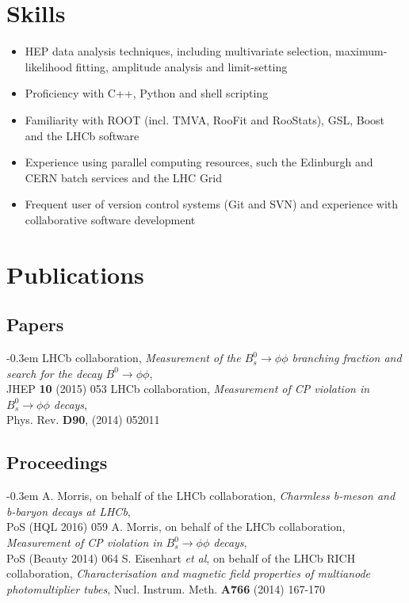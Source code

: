 \documentclass[contbibnum]{simplecv}
\renewcommand{\topicmargin}{8em}
\begin{document}
	\section{Skills}
	\begin{itemize}
		\itemsep-0.3em
		\item HEP data analysis techniques, including multivariate selection, maximum-likelihood fitting, amplitude analysis and limit-setting
		\item Proficiency with C++, Python and shell scripting
		\item Familiarity with ROOT (incl. TMVA, RooFit and RooStats), GSL, Boost and the LHCb software
		\item Experience using parallel computing resources, such the Edinburgh and CERN batch services and the LHC Grid
		\item Frequent user of version control systems (Git and SVN) and experience with collaborative software development
	\end{itemize}
	\section{Publications}
	\renewcommand{\topicmargin}{5em}
	\subsection{Papers}
	\begin{thebibliography}{1}
		\itemsep-0.3em
		LHCb collaboration, \textit{Measurement of the $B^0_s \to \phi\phi$ branching fraction and search for the decay $B^0 \to \phi \phi$},\\ JHEP \textbf{10} (2015) 053
		LHCb collaboration, \textit{Measurement of CP violation in $B^0_s \to \phi\phi$ decays},\\ Phys. Rev. \textbf{D90}, (2014) 052011
	\end{thebibliography}
	\vspace{-1em}
	\subsection{Proceedings}
	\begin{thebibliography}{2}
		\itemsep-0.3em
		A. Morris, on behalf of the LHCb collaboration, \textit{Charmless b-meson and b-baryon decays at LHCb},\\ PoS (HQL 2016) 059
		A. Morris, on behalf of the LHCb collaboration, \textit{Measurement of CP violation in $B^0_s \to \phi\phi$ decays},\\ PoS (Beauty 2014) 064
		S. Eisenhart \textit{et al}, on behalf of the LHCb RICH collaboration, \textit{Characterisation and magnetic field properties of multianode photomultiplier tubes}, Nucl. Instrum. Meth. \textbf{A766} (2014) 167-170
	\end{thebibliography}
\end{document}
